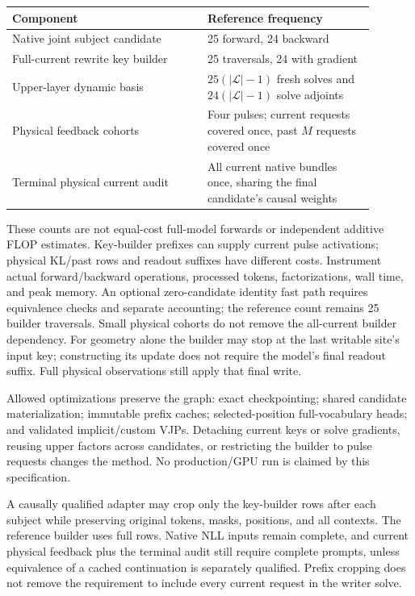 \documentclass[10pt]{article}
\begin{document}
\begin{center}
\begin{tabular}{p{0.48\linewidth}p{0.41\linewidth}}
\toprule
Component & Reference frequency\\
\midrule
Native joint subject candidate & 25 forward, 24 backward\\
Full-current rewrite key builder & 25 traversals, 24 with gradient\\
Upper-layer dynamic basis & $25(|\mathcal L|-1)$ fresh solves and
$24(|\mathcal L|-1)$ solve adjoints\\
Physical feedback cohorts & Four pulses; current requests covered once,
past $M$ requests covered once\\
Terminal physical current audit & All current native bundles once,
sharing the final candidate's causal weights\\
\bottomrule
\end{tabular}
\end{center}
These counts are not equal-cost full-model forwards or independent
additive FLOP estimates. Key-builder prefixes can supply current pulse
activations; physical KL/past rows and readout suffixes have different
costs. Instrument actual forward/backward operations, processed tokens,
factorizations, wall time, and peak memory. An optional zero-candidate
identity fast path requires equivalence checks and separate accounting;
the reference count remains 25 builder traversals. Small physical cohorts
do not remove the all-current builder dependency.
For geometry alone the builder may stop at the last writable site's
input key; constructing its update does not require the model's final
readout suffix. Full physical observations still apply that final write.

Allowed optimizations preserve the graph: exact checkpointing; shared
candidate materialization; immutable prefix caches; selected-position
full-vocabulary heads; and validated implicit/custom VJPs. Detaching
current keys or solve gradients, reusing upper factors across candidates,
or restricting the builder to pulse requests changes the method. No
production/GPU run is claimed by this specification.

A causally qualified adapter may crop only the key-builder rows after
each subject while preserving original tokens, masks, positions, and
all contexts. The reference builder uses full rows. Native NLL inputs
remain complete, and current physical feedback plus the terminal audit
still require complete prompts, unless equivalence of a cached
continuation is separately qualified. Prefix cropping does not remove
the requirement to include every current request in the writer solve.
\end{document}
